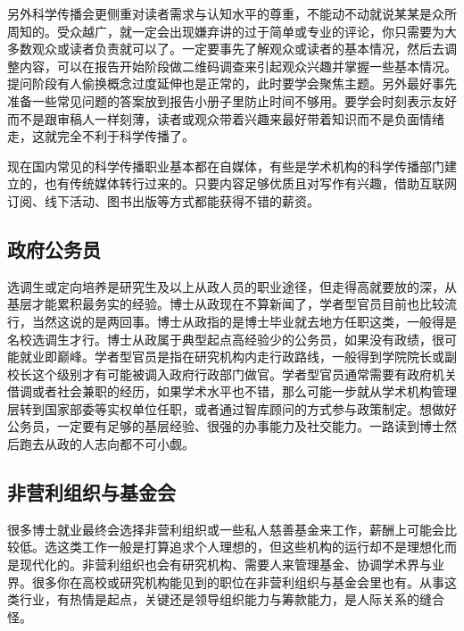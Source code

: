 \documentclass[]{tufte-book}
\begin{document}
另外科学传播会更侧重对读者需求与认知水平的尊重，不能动不动就说某某是众所周知的。受众越广，就一定会出现嫌弃讲的过于简单或专业的评论，你只需要为大多数观众或读者负责就可以了。一定要事先了解观众或读者的基本情况，然后去调整内容，可以在报告开始阶段做二维码调查来引起观众兴趣并掌握一些基本情况。提问阶段有人偷换概念过度延伸也是正常的，此时要学会聚焦主题。另外最好事先准备一些常见问题的答案放到报告小册子里防止时间不够用。要学会时刻表示友好而不是跟审稿人一样刻薄，读者或观众带着兴趣来最好带着知识而不是负面情绪走，这就完全不利于科学传播了。

现在国内常见的科学传播职业基本都在自媒体，有些是学术机构的科学传播部门建立的，也有传统媒体转行过来的。只要内容足够优质且对写作有兴趣，借助互联网订阅、线下活动、图书出版等方式都能获得不错的薪资。

\hypertarget{ux653fux5e9cux516cux52a1ux5458}{%
\subsection{政府公务员}\label{ux653fux5e9cux516cux52a1ux5458}}

选调生或定向培养是研究生及以上从政人员的职业途径，但走得高就要放的深，从基层才能累积最务实的经验。博士从政现在不算新闻了，学者型官员目前也比较流行，当然这说的是两回事。博士从政指的是博士毕业就去地方任职这类，一般得是名校选调生才行。博士从政属于典型起点高经验少的公务员，如果没有政绩，很可能就业即巅峰。学者型官员是指在研究机构内走行政路线，一般得到学院院长或副校长这个级别才有可能被调入政府行政部门做官。学者型官员通常需要有政府机关借调或者社会兼职的经历，如果学术水平也不错，那么可能一步就从学术机构管理层转到国家部委等实权单位任职，或者通过智库顾问的方式参与政策制定。想做好公务员，一定要有足够的基层经验、很强的办事能力及社交能力。一路读到博士然后跑去从政的人志向都不可小觑。

\hypertarget{ux975eux8425ux5229ux7ec4ux7ec7ux4e0eux57faux91d1ux4f1a}{%
\subsection{非营利组织与基金会}\label{ux975eux8425ux5229ux7ec4ux7ec7ux4e0eux57faux91d1ux4f1a}}

很多博士就业最终会选择非营利组织或一些私人慈善基金来工作，薪酬上可能会比较低。选这类工作一般是打算追求个人理想的，但这些机构的运行却不是理想化而是现代化的。非营利组织也会有研究机构、需要人来管理基金、协调学术界与业界。很多你在高校或研究机构能见到的职位在非营利组织与基金会里也有。从事这类行业，有热情是起点，关键还是领导组织能力与筹款能力，是人际关系的缝合怪。
\end{document}
